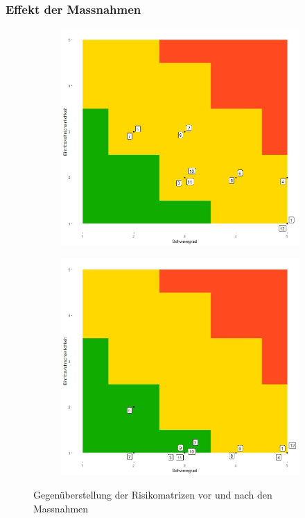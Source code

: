 \documentclass[a4paper]{report}
\begin{document}
\newpage
\subsubsection{Effekt der Massnahmen}
\label{ssec:MassEffekt}
\begin{figure}[h!]
	\centering
	\begin{subfigure}[b]{0.8\textwidth}
		\includegraphics[keepaspectratio,width=\textwidth]{Risikomatrix}
	\end{subfigure}
	\begin{subfigure}[b]{0.8\textwidth}
		\includegraphics[keepaspectratio,width=\textwidth]{Risikomatrix_nachher}
	\end{subfigure}
	\caption{Gegenüberstellung der Risikomatrizen vor und nach den Massnahmen}
	\label{fig:Gegenueberstellung}
\end{figure}
\end{document}
